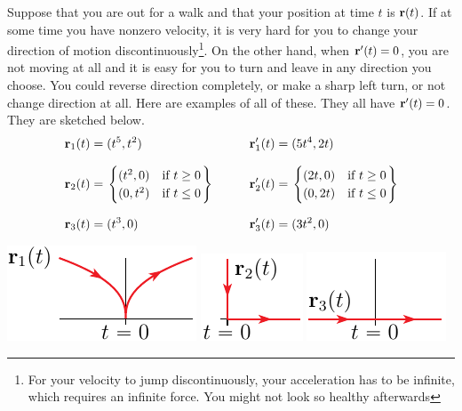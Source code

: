 \begin{eg}[$\vr'(t)=\vZero$]
Suppose that you are out for a walk and that your position
at time $t$ is $\mathbf{r}(t)$. If at some time you have nonzero velocity,
it is very hard for you to  change your direction of motion 
discontinuously\footnote{For your velocity to jump
discontinuously, your acceleration has to be infinite, which requires an 
infinite force. You might not look so healthy afterwards}. On the other hand, when 
$\mathbf{r}'(t)=0$, you are not moving at all and it is easy for you to turn and
leave in any direction you choose. You could reverse direction completely,
or make a sharp left turn, or not change direction at all. Here are examples 
of all of these. They all have $\mathbf{r}'(t)=0$. They are sketched below.
\begin{alignat*}{3}
\mathbf{r}_1(t) &= (t^5, t^2) &
\mathbf{r}_1'(t)&= (5t^4, 2t) 
\\[0.1in]
\mathbf{r}_2(t) &= \left.\begin{cases} (t^2, 0) & \text{if $t\ge 0$} \\
                        (0 , t^2) & \text{if $t\le 0$}
          \end{cases}\right\}\qquad &
\mathbf{r}_2'(t)&= \left.\begin{cases} (2t, 0) & \text{if $t\ge 0$} \\
                        (0 , 2t) & \text{if $t\le 0$}
          \end{cases} \right\}
\\[0.1in]
\mathbf{r}_3(t) &= (t^3, 0) &
\mathbf{r}_3'(t) &= (3t^2, 0) 
\end{alignat*}
\begin{efig}
\begin{center}
     \includegraphics{cuspA.pdf}\qquad\qquad
     \includegraphics{cuspB.pdf}\qquad\qquad
     \includegraphics{nocusp.pdf}
\end{center}
\end{efig}


\end{eg}

